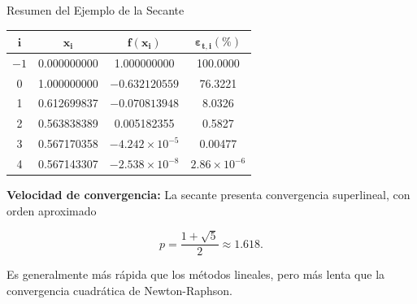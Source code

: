\documentclass[../../main.tex]{subfiles}
\begin{document}

\begin{frame}{Resumen del Ejemplo de la Secante}

\centering
\small

\begin{tabular}{|c|c|c|c|}
\hline
\(\boldsymbol{i}\) &
\(\boldsymbol{x_i}\) &
\(\boldsymbol{f(x_i)}\) &
\(\boldsymbol{\varepsilon_{t,i}(\%)}\) \\ \hline
\(-1\) &
0.000000000 &
1.000000000 &
100.0000 \\

0 &
1.000000000 &
\(-0.632120559\) &
76.3221 \\

1 &
0.612699837 &
\(-0.070813948\) &
8.0326 \\

2 &
0.563838389 &
0.005182355 &
0.5827 \\

3 &
0.567170358 &
\(-4.242\times10^{-5}\) &
0.00477 \\

4 &
0.567143307 &
\(-2.538\times10^{-8}\) &
\(2.86\times10^{-6}\) \\ \hline
\end{tabular}

\vspace{0.7em}

\raggedright

\textbf{Velocidad de convergencia:}
La secante presenta convergencia superlineal, con orden aproximado

\[
p=\frac{1+\sqrt{5}}{2}\approx1.618.
\]

Es generalmente más rápida que los métodos lineales, pero más lenta
que la convergencia cuadrática de Newton-Raphson.

\end{frame}


\end{document}
